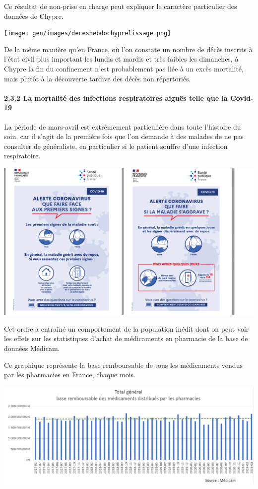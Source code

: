 \documentclass[
]{article}
\begin{document}
Ce résultat de non-prise en charge peut expliquer le caractère
particulier des données de Chypre.

\texttt{[image: gen/images/deceshebdochyprelissage.png]}

De la même manière qu'en France, où l'on constate un nombre de décès
inscrits à l'état civil plus important les lundis et mardis et très
faibles les dimanches, à Chypre la fin du confinement n'est probablement
pas liée à un excès mortalité, mais plutôt à la découverte tardive des
décès non répertoriés.

\hypertarget{la-mortalituxe9-des-infections-respiratoires-aiguuxebs-telle-que-la-covid-19}{%
\paragraph{2.3.2 La mortalité des infections respiratoires aiguës telle
que la
Covid-19}\label{la-mortalituxe9-des-infections-respiratoires-aiguuxebs-telle-que-la-covid-19}}

La période de mars-avril est extrêmement particulière dans toute
l'histoire du soin, car il s'agit de la première fois que l'on demande à
des malades de ne pas consulter de généraliste, en particulier si le
patient souffre d'une infection respiratoire.

\includegraphics[width=10.41667in,height=\textheight]{data/images/flyerspf.png}

Cet ordre a entraîné un comportement de la population inédit dont on
peut voir les effets sur les statistiques d'achat de médicaments en
pharmacie de la base de données Médicam.

Ce graphique représente la base remboursable de tous les médicaments
vendus par les pharmacies en France, chaque mois.

\includegraphics[width=10.41667in,height=\textheight]{data/images/medictot.png}
\end{document}
